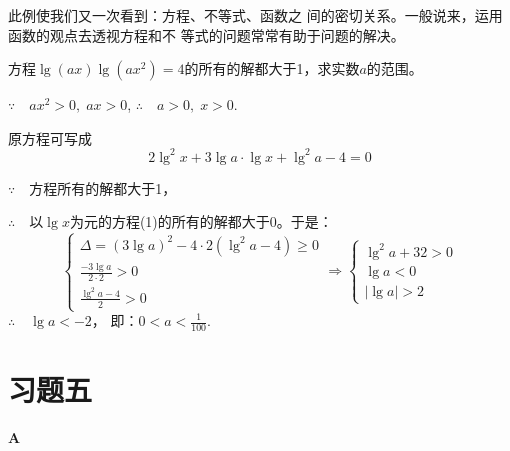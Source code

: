 \begin{note}
此例使我们又一次看到：方程、不等式、函数之
间的密切关系。一般说来，运用函数的观点去透视方程和不
等式的问题常常有助于问题的解决。
\end{note}    

\begin{example}
方程$\lg(ax)\lg(ax^2)=4$的所有的解都大于1，求实数$a$的范围。
\end{example}

\begin{solution}
$\because\quad ax^2>0,\; ax>0$, \qquad $\therefore\quad a>0,\; x>0$.

原方程可写成
\begin{equation}
   2\lg^2 x+3\lg a\cdot \lg x+\lg^2 a-4=0 \tag{1} 
\end{equation}

$\because\quad $方程所有的解都大于1，

$\therefore\quad $以$\lg x$为元的方程(1)的所有的解都大于0。于是：
\[\begin{cases}
\Delta =(3\lg a)^2-4\cdot 2(\lg^2 a-4)\ge 0\\
\frac{-3\lg a}{2\cdot 2}>0\\
\frac{\lg^2 a-4}{2}>0
\end{cases}\Longrightarrow \begin{cases}
    \lg^2 a+32>0\\
    \lg a<0\\
    |\lg a|>2
\end{cases}\]
$\therefore\quad \lg a<-2$，
即：$0<a<\frac{1}{100}$.
\end{solution}

\section*{习题五}
\begin{center}
    \bfseries A
\end{center}

